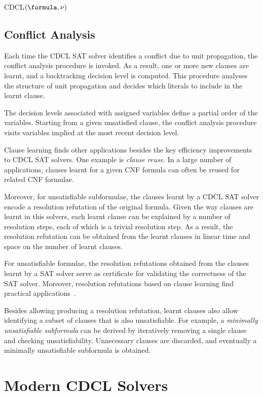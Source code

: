 \begin{algorithm}[!ht]
    \caption{CDCL$(\formula, \nu)$}%
\label{alg:cdcl}
\end{algorithm}

\subsection{Conflict Analysis}

Each time the CDCL SAT solver identifies a conflict due to unit propagation, the
conflict analysis procedure is invoked. As a result, one or more new clauses are
learnt, and a backtracking decision level is computed. This procedure analyses
the structure of unit propagation and decides which literals to include in the
learnt clause.

The decision levels associated with assigned variables define a partial order of
the variables. Starting from a given unsatisfied clause, the conflict analysis
procedure visits variables implied at the most recent decision level. %

Clause learning finds other applications besides the key efficiency improvements
to CDCL SAT solvers. One example is \emph{clause reuse}. In a large number of
applications, clauses learnt for a given CNF formula can often be reused for
related CNF formulae. 

Moreover, for unsatisfiable subformulae, the clauses learnt by a CDCL SAT solver
encode a resolution refutation of the original formula. Given the way clauses
are learnt in this solvers, each learnt clause can be explained by a number of
resolution steps, each of which is a trivial resolution step. As a result, the
resolution refutation can be obtained from the learnt clauses in linear time and
space on the number of learnt clauses. 

For unsatisfiable formulae, the resolution refutations obtained from the clauses
learnt by a SAT solver serve as certificate for validating the correctness of
the SAT solver. Moreover, resolution refutations based on clause learning find
practical applications~\cite{cdclchapter}.

Besides allowing producing a resolution refutation, learnt clauses also allow
identifying a subset of clauses that is also unsatisfiable. For example, a
\emph{minimally unsatisfiable subformula} can be derived by iteratively removing
a single clause and checking unsatisfiability. Unnecessary clauses are
discarded, and eventually a minimally unsatisfiable subformula is obtained.

\section{Modern CDCL Solvers}%
\label{sec:minisat}
